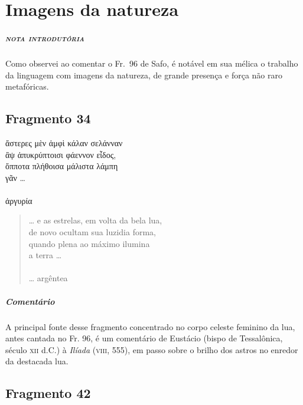 {\chapter{Imagens da natureza}

\paragraph{\textsc{nota introdutória}}
Como observei ao comentar o Fr.~96 de Safo, é notável em sua mélica o trabalho
da linguagem com imagens da natureza, de grande presença e força não raro
metafóricas.

\section{Fragmento 34}

\begin{gkverse}
ἄστερες μὲν ἀμφὶ κάλαν σελάνναν\\
ἂψ ἀπυκρύπτοισι φάεννον εἶδος,\\
ὄπποτα πλήθοισα μάλιστα λάμπη\\
γᾶν \ldots{}\\
\ast\quad\ast\quad\ast\\
ἀργυρία
\end{gkverse}

\begin{verse}
\ldots{} e as estrelas, em volta da bela lua,\\
de novo ocultam sua luzidia forma,\\
quando plena ao máximo ilumina\\
a terra \ldots{}\\
\ast\quad\ast\quad\ast\\
\ldots{} argêntea
\end{verse}

{\paragraph{Comentário} A principal fonte desse fragmento concentrado no corpo celeste feminino da lua, antes cantada no Fr. 96, é
um comentário de Eustácio (bispo de Tessalônica, século \textsc{xii} d.C.) à
\textit{Ilíada }(\textsc{viii}, 555), em passo sobre o brilho dos astros no enredor da destacada lua.} 


\pagebreak
\section{Fragmento 42}

}
